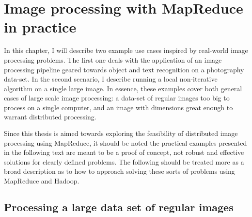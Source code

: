 \documentclass [12pt,a4paper]{report}
\begin{document}



\chapter{Image processing with MapReduce in practice}

In this chapter, I will describe two example use cases inspired by real-world image processing problems. The first one deals with the application of an image processing pipeline geared towards object and text recognition on a photography data-set. In the second scenario, I describe running a local non-iterative algorithm on a single large image. In essence, these examples cover both general cases of large scale image processing: a data-set of regular images too big to process on a single computer, and an image with dimensions great enough to warrant distributed processing.

Since this thesis is aimed towards exploring the feasibility of distributed image processing using MapReduce, it should be noted the practical examples presented in the following text are meant to be a proof of concept, not robust and effective solutions for clearly defined problems. The following should be treated more as a broad description as to how to approach solving these sorts of problems using MapReduce and Hadoop.

\section{Processing a large data set of regular images}
\end{document}
